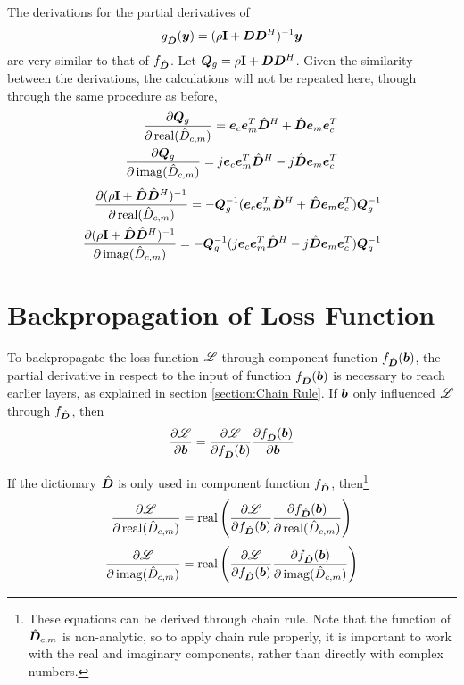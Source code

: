 \begin{appendices}
The derivations for the partial derivatives of
\begin{equation}
g_{\hat{\bm{D}}}(\bm{y}) = (\rho{\bf I} + \bm{D}\bm{D}^H)^{-1}\bm{y}
\end{equation}
are very similar to that of $f_{\hat{\bm{D}}}$. Let $\bm{Q}_g = \rho{\bf I} + \bm{D}\bm{D}^H$. Given the similarity between the derivations, the calculations will not be repeated here, though through the same procedure as before,
%
\begin{equation}
\begin{split}
\frac{\partial \bm{Q}_g}{\partial 
\operatorname{real}(\hat{D}_{c,m})} = \bm{e}_c\bm{e}_m^T\hat{\bm{D}}^H + \hat{\bm{D}}\bm{e}_m\bm{e}_c^T
\\
\frac{\partial \bm{Q}_g}{\partial \operatorname{imag}(\hat{D}_{c,m})} = j\bm{e}_c\bm{e}_m^T\hat{\bm{D}}^H - j\hat{\bm{D}}\bm{e}_m\bm{e}_c^T
\end{split}
\end{equation}
%
\begin{equation}
\begin{split}
\frac{\partial (\rho{\bf I} + \hat{\bm{D}}\hat{\bm{D}}^H)^{-1}}{\partial 
\operatorname{real}(\hat{D}_{c,m})} = -\bm{Q}_g^{-1}(\bm{e}_c\bm{e}_m^T\hat{\bm{D}}^H + \hat{\bm{D}}\bm{e}_m\bm{e}_c^T)\bm{Q}_g^{-1}
\\
\frac{\partial (\rho{\bf I} + \hat{\bm{D}}\hat{\bm{D}}^H)^{-1}}{\partial \operatorname{imag}(\hat{D}_{c,m})} = -\bm{Q}_g^{-1}(j\bm{e}_c\bm{e}_m^T\hat{\bm{D}}^H - j\hat{\bm{D}}\bm{e}_m\bm{e}_c^T)\bm{Q}_g^{-1}
\end{split}
\end{equation}

\section{Backpropagation of Loss Function}
To backpropagate the loss function $\mathscr{L}$ through component function $f_{\hat{\bm{D}}}(\bm{b})$, the partial derivative in respect to the input of function $f_{\hat{\bm{D}}}(\bm{b})$ is necessary to reach earlier layers, as explained in section \ref{section:Chain Rule}. If $\bm{b}$ only influenced $\mathscr{L}$ through $f_{\hat{\bm{D}}}$, then
\begin{equation}
\frac{\partial \mathscr{L}}{\partial \bm{b}} = \frac{\partial \mathscr{L}}{\partial f_{\hat{\bm{D}}}(\bm{b})}\frac{\partial f_{\hat{\bm{D}}}(\bm{b})}{\partial \bm{b}}
\end{equation}

If the dictionary $\hat{\bm{D}}$ is only used in component function $f_{\hat{\bm{D}}}$, then\footnote{These equations can be derived through chain rule. Note that the function of $\hat{\bm{D}}_{c,m}$ is non-analytic, so to apply chain rule properly, it is important to work with the real and imaginary components, rather than directly with complex numbers.}
\begin{equation}
\frac{\partial \mathscr{L}}{\partial \operatorname{real}(\hat{D}_{c,m})} = \operatorname{real}\left(\frac{\partial \mathscr{L}}{\partial f_{\hat{\bm{D}}}(\bm{b})}\frac{\partial f_{\hat{\bm{D}}}(\bm{b})}{\partial \operatorname{real}(\hat{D}_{c,m})}\right)
\end{equation}
\begin{equation}
\frac{\partial \mathscr{L}}{\partial \operatorname{imag}(\hat{D}_{c,m})} = \operatorname{real}\left(\frac{\partial \mathscr{L}}{\partial f_{\hat{\bm{D}}}(\bm{b})}\frac{\partial f_{\hat{\bm{D}}}(\bm{b})}{\partial \operatorname{imag}(\hat{D}_{c,m})}\right)
\end{equation}


\end{appendices}

